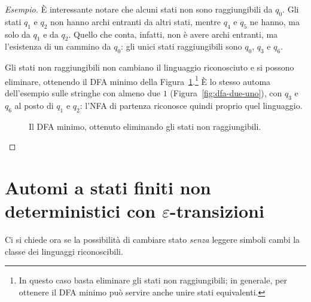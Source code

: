 \documentclass[a4paper, 11pt, oneside]{book}
\theoremstyle{formale}
\newenvironment{esempio}
    {\begin{proof}[\textit{Esempio}]\renewcommand{\qedsymbol}{$\diamond$}}
    {\end{proof}}
\begin{document}
\begin{esempio}
        \`E interessante notare che alcuni stati non sono raggiungibili da $q_0$. Gli
        stati $q_1$ e $q_2$ non hanno archi entranti da altri stati, mentre $q_4$ e $q_5$
        ne hanno, ma solo da $q_1$ e da $q_2$. Quello che conta, infatti, non \`e avere
        archi entranti, ma l'esistenza di un cammino da $q_0$: gli unici stati
        raggiungibili sono $q_0$, $q_3$ e $q_6$.

        Gli stati non raggiungibili non cambiano il linguaggio riconosciuto e si possono
        eliminare, ottenendo il DFA minimo della Figura~\ref{fig:dfa-minimo}.\footnote{In
        questo caso basta eliminare gli stati non raggiungibili; in generale, per ottenere
        il DFA minimo pu\`o servire anche unire stati equivalenti.} \`E lo stesso automa
        dell'esempio sulle stringhe con almeno due $1$ (Figura~\ref{fig:dfa-due-uno}), con
        $q_3$ e $q_6$ al posto di $q_1$ e $q_2$: l'NFA di partenza riconosce quindi proprio
        quel linguaggio.

        \begin{figure}[H]
            \centering
            \caption{Il DFA minimo, ottenuto eliminando gli stati non raggiungibili.}
            \label{fig:dfa-minimo}
        \end{figure}
    \end{esempio}

    \section{Automi a stati finiti non deterministici con
        \texorpdfstring{$\varepsilon$}{ε}-transizioni}
    Ci si chiede ora se la possibilit\`a di cambiare stato \emph{senza} leggere simboli
    cambi la classe dei linguaggi riconoscibili.
\end{document}
